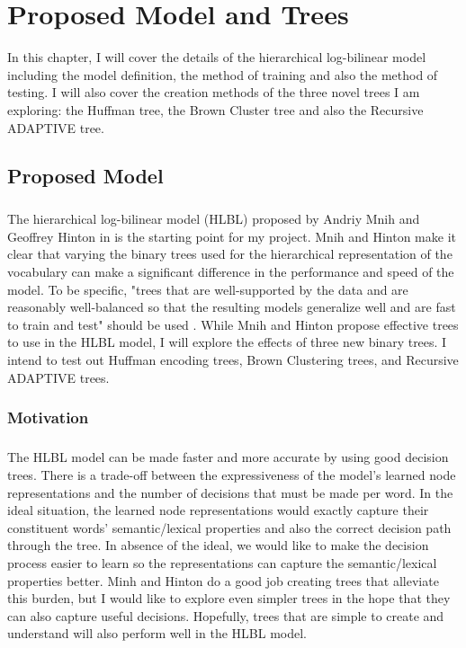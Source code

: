 \chapter{Proposed Model and Trees}
In this chapter, I will cover the details of the hierarchical log-bilinear model including the model definition, the method of training and also the method of testing. I will also cover the creation methods of the three novel trees I am exploring: the Huffman tree, the Brown Cluster tree and also the Recursive ADAPTIVE tree.

\section{Proposed Model} \label{sec:proposedModel}
\paragraph{}
The hierarchical log-bilinear model (HLBL) proposed by Andriy Mnih and Geoffrey Hinton in \cite{MnihHinton2009} is the starting point for my project. Mnih and Hinton make it clear that varying the binary trees used for the hierarchical representation of the vocabulary can make a significant difference in the performance and speed of the model. To be specific, "trees
that are well-supported by the data and are reasonably well-balanced so that the resulting models
generalize well and are fast to train and test" should be used \cite[pg. 5]{MnihHinton2009}. While Mnih and Hinton propose  effective trees to use in the HLBL model, I will explore the effects of three new binary trees. I intend to test out Huffman encoding trees, Brown Clustering trees, and Recursive ADAPTIVE trees.
\subsection{Motivation}
\paragraph{}
The HLBL model can be made faster and more accurate by using good decision trees. There is a trade-off between the expressiveness of the model's learned node representations and the number of decisions that must be made per word. In the ideal situation, the learned node representations would exactly capture their constituent words' semantic/lexical properties and also the correct decision path through the tree. In absence of the ideal, we would like to make the decision process easier to learn so the representations can capture the semantic/lexical properties better. Minh and Hinton do a good job creating trees that alleviate this burden, but I would like to explore even simpler trees in the hope that they can also capture useful decisions. Hopefully, trees that are simple to create and understand will also perform well in the HLBL model. 

